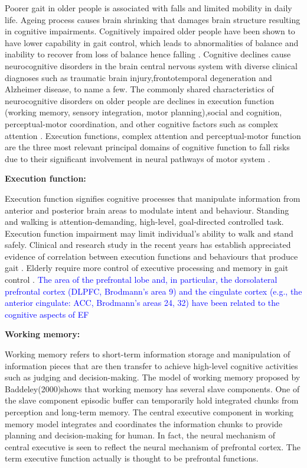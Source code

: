 \documentclass[conference,compsoc]{IEEEtran}
\begin{document}
Poorer gait in older people is associated with falls and limited mobility in daily life. Ageing process causes brain shrinking that damages brain structure resulting in cognitive impairments. Cognitively impaired older people have been shown to have lower capability in gait control, which leads to abnormalities of balance and inability to recover from loss of balance \cite{Thelen_1997} hence falling \cite{Martin_2012, Carty_2014}. Cognitive declines cause neurocognitive disorders in the brain central nervous system with diverse clinical diagnoses such as traumatic brain injury,frontotemporal degeneration and Alzheimer disease, to name a few. The commonly shared characteristics of neurocognitive disorders on older people are declines in execution function (working memory,  sensory integration, motor planning),social and cognition, perceptual-motor coordination, and other cognitive factors such as complex attention \cite{Sachdev_2014}. Execution functions, complex attention and perceptual-motor function are the three most relevant principal domains of cognitive function to fall risks due to their significant involvement in neural pathways of motor system \cite{Zhang_2019}. 

\textbf{Execution function:}

Execution function signifies cognitive processes that manipulate information from anterior and posterior brain areas to modulate intent and behaviour. 
Standing and walking is attention-demanding, high-level, goal-directed controlled task. Execution function impairment may limit individual's ability to walk and stand safely. Clinical and research study in the recent years has establish appreciated evidence of correlation between execution functions and behaviours that produce gait \cite{Yogev_Seligmann_2007}. Elderly require more control of executive processing and memory in gait control \cite{Holtzer_2006}.
\textcolor{blue}{The area of the prefrontal
lobe and, in particular, the dorsolateral prefrontal cortex
(DLPFC, Brodmann’s area 9) and the cingulate cortex
(e.g., the anterior cingulate: ACC, Brodmann’s areas 24,
32) have been related to the cognitive aspects of EF \cite{Yogev_Seligmann_2007}}

\textbf{Working memory:}

Working memory refers to short-term information storage and manipulation of information pieces that are then transfer to achieve high-level cognitive activities such as judging and decision-making. The model of working memory proposed by Baddeley(2000)shows that working memory has several slave components. One of the slave component episodic buffer can temporarily hold integrated chunks from perception and long-term memory. The central executive component in working memory model integrates and coordinates the information chunks to provide planning and decision-making for human. In fact, the neural mechanism of central executive is seen to reflect the neural mechanism of prefrontal cortex. The term executive function actually is thought to be prefrontal functions.
\end{document}
